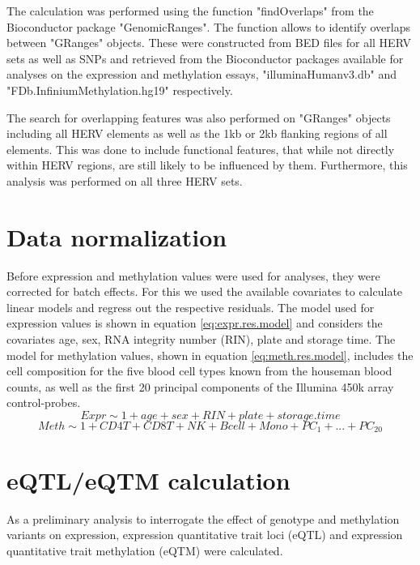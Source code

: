 \documentclass[a4paper,12pt,twoside,openright]{report}
\begin{document}
The calculation was performed using the function "findOverlaps" from the Bioconductor package "GenomicRanges"\cite{10.1371/journal.pcbi.1003118}. The function allows to identify overlaps between "GRanges" objects. These were constructed from BED files for all HERV sets as well as SNPs and retrieved from the Bioconductor packages available for analyses on the expression and methylation essays, "illuminaHumanv3.db"\cite{illuminaHumanv3.db} and "FDb.InfiniumMethylation.hg19"\cite{FDb.InfiniumMethylation.hg19} respectively.

The search for overlapping features was also performed on "GRanges" objects including all HERV elements as well as the 1kb or 2kb flanking regions of all elements. This was done to include functional features, that while not directly within HERV regions, are still likely to be influenced by them. Furthermore, this analysis was performed on all three HERV sets.

\section{Data normalization}
\label{Methods:Data normalization}
Before expression and methylation values were used for analyses, they were corrected for batch effects. For this we used the available covariates to calculate linear models and regress out the respective residuals. The model used for expression values is shown in equation \ref{eq:expr.res.model} and considers the covariates age, sex, RNA integrity number (RIN), plate and storage time. The model for methylation values, shown in equation \ref{eq:meth.res.model},
includes the cell composition for the five blood cell types known from the houseman blood counts, as well as the first 20 principal components of the Illumina 450k array control-probes. 
\begin{equation}
\label{eq:expr.res.model}
Expr \sim 1+age+sex+RIN+plate+storage.time
\end{equation}
\begin{equation}
\label{eq:meth.res.model}
Meth \sim 1+CD4T+CD8T+NK+Bcell+Mono+PC_1+...+PC_{20}
\end{equation}


\section{eQTL/eQTM calculation}
\label{Methods:eQTL/eQTM calculation}
As a preliminary analysis to interrogate the effect of genotype and methylation variants on expression, expression quantitative trait loci (eQTL) and expression quantitative trait methylation (eQTM) were calculated.
\end{document}
